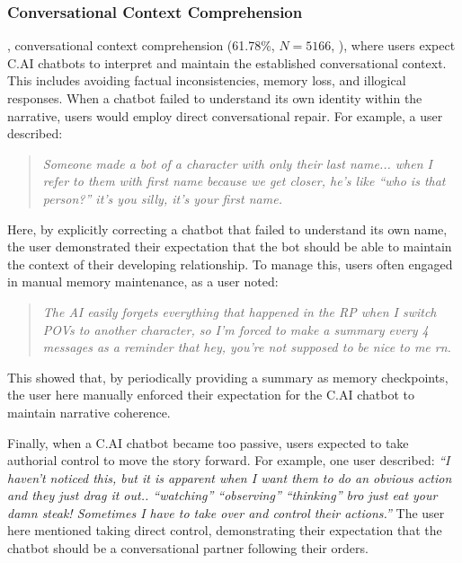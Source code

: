 \documentclass[sigconf, nonacm]{acmart}
\newcommand{\implications}[1]{{\color{black}{#1}}}
\newcommand{\newfinding}[1]{{\color{black}{#1}}}
\begin{document}
\subsubsection{Conversational Context Comprehension}
\label{ConversationalContextComprehension}
\implications{The most common communication expectation}, conversational context comprehension (61.78\%, $N=5166$, \implications{or 23.10\% of all posts}), where users expect C.AI chatbots to interpret and maintain the established conversational context. This includes avoiding factual inconsistencies, memory loss, and illogical responses. \newfinding{Users primarily expected C.AI to remember its own persona and relationship details.} When a chatbot failed to understand its own identity within the narrative, users would employ direct conversational repair. For example, a user described:

\begin{quote}
   \textit{ Someone made a bot of a character with only their last name... when I refer to them with first name because we get closer, he's like ``who is that person?'' it's you silly, it's your first name.}
\end{quote}

Here, by explicitly correcting a chatbot that failed to understand its own name, the user demonstrated their expectation that the bot should be able to maintain the context of their developing relationship. \newfinding{Users also expected the AI to retain critical plot points to ensure narrative coherence, especially in long-running roleplays.} To manage this, users often engaged in manual memory maintenance, as a user noted:

\begin{quote}
    \textit{The AI easily forgets everything that happened in the RP when I switch POVs to another character, so I'm forced to make a summary every 4 messages as a reminder that hey, you're not supposed to be nice to me rn.}
\end{quote}

This showed that, by periodically providing a summary as memory checkpoints, the user here manually enforced their expectation for the C.AI chatbot to maintain narrative coherence.

Finally, when a C.AI chatbot became too passive, users expected to take authorial control to move the story forward. For example, one user described: \textit{``I haven't noticed this, but it is apparent when I want them to do an obvious action and they just drag it out.. ``watching'' ``observing'' ``thinking'' bro just eat your damn steak! Sometimes I have to take over and control their actions.''} The user here mentioned taking direct control, demonstrating their expectation that the chatbot should be a conversational partner following their orders.
\end{document}
